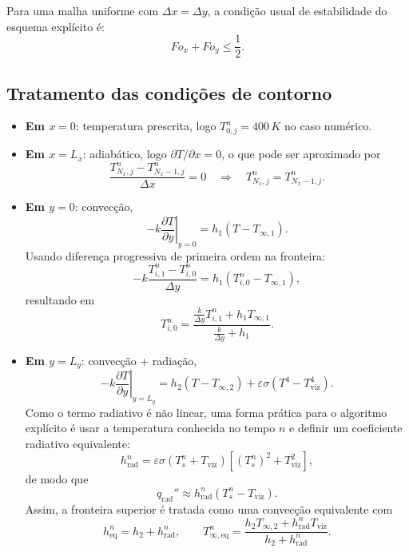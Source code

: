 \documentclass[12pt,a4paper]{article}
\begin{document}
Para uma malha uniforme com $\Delta x=\Delta y$, a condição usual de estabilidade do esquema explícito é:
\begin{equation}
Fo_x + Fo_y \leq \frac{1}{2}.
\end{equation}

\subsection*{Tratamento das condições de contorno}
\begin{itemize}[leftmargin=1.2cm]
    \item \textbf{Em $x=0$}: temperatura prescrita, logo $T_{0,j}^{n}=400\,\si{K}$ no caso numérico.
    \item \textbf{Em $x=L_x$}: adiabático, logo $\partial T/\partial x = 0$, o que pode ser aproximado por
    \begin{equation}
    \frac{T_{N_x,j}^{n}-T_{N_x-1,j}^{n}}{\Delta x}=0
    \quad\Rightarrow\quad
    T_{N_x,j}^{n}=T_{N_x-1,j}^{n}.
    \end{equation}
    \item \textbf{Em $y=0$}: convecção,
    \begin{equation}
    -k\left.\frac{\partial T}{\partial y}\right|_{y=0}=h_1(T-T_{\infty,1}).
    \end{equation}
    Usando diferença progressiva de primeira ordem na fronteira:
    \begin{equation}
    -k\frac{T_{i,1}^{n}-T_{i,0}^{n}}{\Delta y}=h_1(T_{i,0}^{n}-T_{\infty,1}),
    \end{equation}
    resultando em
    \begin{equation}
    T_{i,0}^{n}=\frac{\tfrac{k}{\Delta y}T_{i,1}^{n}+h_1T_{\infty,1}}{\tfrac{k}{\Delta y}+h_1}.
    \end{equation}
    \item \textbf{Em $y=L_y$}: convecção + radiação,
    \begin{equation}
    -k\left.\frac{\partial T}{\partial y}\right|_{y=L_y}=h_2(T-T_{\infty,2})+\varepsilon\sigma(T^4-T_{\text{viz}}^4).
    \end{equation}
    Como o termo radiativo é não linear, uma forma prática para o algoritmo explícito é usar a temperatura conhecida no tempo $n$ e definir um coeficiente radiativo equivalente:
    \begin{equation}
    h_{\text{rad}}^{n}=\varepsilon\sigma\left(T_{s}^{n}+T_{\text{viz}}\right)\left[(T_{s}^{n})^2+T_{\text{viz}}^2\right],
    \end{equation}
    de modo que
    \begin{equation}
    q_{\text{rad}}'' \approx h_{\text{rad}}^{n}(T_s^{n}-T_{\text{viz}}).
    \end{equation}
    Assim, a fronteira superior é tratada como uma convecção equivalente com
    \begin{equation}
    h_{\text{eq}}^{n}=h_2+h_{\text{rad}}^{n},
    \qquad
    T_{\infty,\text{eq}}^{n}=\frac{h_2T_{\infty,2}+h_{\text{rad}}^{n}T_{\text{viz}}}{h_2+h_{\text{rad}}^{n}}.
    \end{equation}
\end{itemize}
\end{document}
